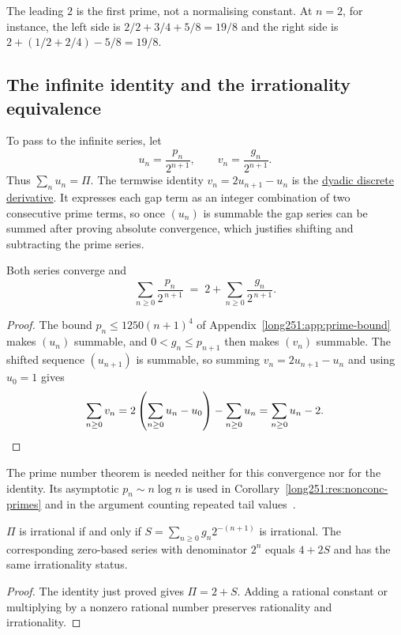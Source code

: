\documentclass[11pt]{article}
\makeatletter
\newcommand{\compatlabel}[1]{\ltx@label{#1}}
\makeatother
\begin{document}
The leading $2$ is the first prime, not a normalising constant.
At $n=2$, for instance, the left side is $2/2+3/4+5/8=19/8$ and the right side
is $2+(1/2+2/4)-5/8=19/8$.

\subsection{The infinite identity and the irrationality equivalence}\label{long251:sec:infinite}\compatlabel{sec:infinite}

To pass to the infinite series, let
\[
 u_n=\frac{p_n}{2^{n+1}},\qquad v_n=\frac{g_n}{2^{n+1}}.
\]
Thus $\sum_nu_n=\Pi$.  The termwise identity $v_n=2u_{n+1}-u_n$ is the
\href{https://github.com/wcook04/plectis-erdos/blob/3d6d938d696fed0fb71dd55115a18a73738ff223/lean/ErdosProblems/Erdos251/PrimeGapDyadicTail.lean\#L202}{dyadic
discrete derivative}.  It expresses each gap term as an integer combination of
two consecutive prime terms, so once $(u_n)$ is summable the gap series can be
summed after proving absolute convergence, which justifies shifting
and subtracting the prime series.

\begin{theorem}\label{long251:res:infinite}
Both series converge and
\[
 \sum_{n\ge0}\frac{p_n}{2^{\,n+1}}
 \;=\;2+\sum_{n\ge0}\frac{g_n}{2^{\,n+1}} .
\]
\end{theorem}

\begin{proof}
The bound $p_n\le1250(n+1)^4$ of Appendix~\ref{long251:app:prime-bound} makes $(u_n)$
summable, and $0<g_n\le p_{n+1}$ then makes $(v_n)$ summable.  The shifted
sequence $(u_{n+1})$ is summable, so summing $v_n=2u_{n+1}-u_n$ and using
$u_0=1$ gives
\[
 \sum_{n\ge0}v_n
 =2\left(\sum_{n\ge0}u_n-u_0\right)-\sum_{n\ge0}u_n
 =\sum_{n\ge0}u_n-2 . \qedhere
\]
\end{proof}

The prime number theorem is needed neither for this convergence nor for
the identity.  Its asymptotic $p_n\sim n\log n$ is used in
Corollary~\ref{long251:res:nonconc-primes} and in the argument counting
repeated tail values~\cite[Chapter~6]{mv2007}.

\begin{corollary}\label{long251:res:irr-equivalence}\label{res:irr-equivalence}
$\Pi$ is irrational if and only if $S=\sum_{n\ge0}g_n2^{-(n+1)}$ is irrational.
The corresponding zero-based series with denominator $2^n$ equals $4+2S$ and
has the same irrationality status.
\end{corollary}
\begin{proof}
The identity just proved gives $\Pi=2+S$.  Adding a rational constant or
multiplying by a nonzero rational number preserves rationality and
irrationality.
\end{proof}
\end{document}
